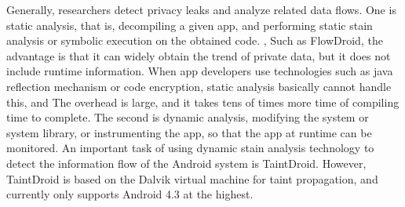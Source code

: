 \documentclass[
    ngerman,american
    ]{scrartcl}
\newcommand{\lang}{en}
\begin{document}
\begin{description}[style=unboxed]
            \item [\questionTwo{\lang}]
                Generally, researchers detect privacy leaks and analyze related data flows. One is static analysis, that is, decompiling a given app, and performing static stain analysis or symbolic execution on the obtained code. , Such as FlowDroid, the advantage is that it can widely obtain the trend of private data, but it does not include runtime information. When app developers use technologies such as java reflection mechanism or code encryption, static analysis basically cannot handle this, and The overhead is large, and it takes tens of times more time of compiling time to complete. The second is dynamic analysis, modifying the system or system library, or instrumenting the app, so that the app at runtime can be monitored. An important task of using dynamic stain analysis technology to detect the information flow of the Android system is TaintDroid. However, TaintDroid is based on the Dalvik virtual machine for taint propagation, and currently only supports Android 4.3 at the highest.


\end{description}
\end{document}
